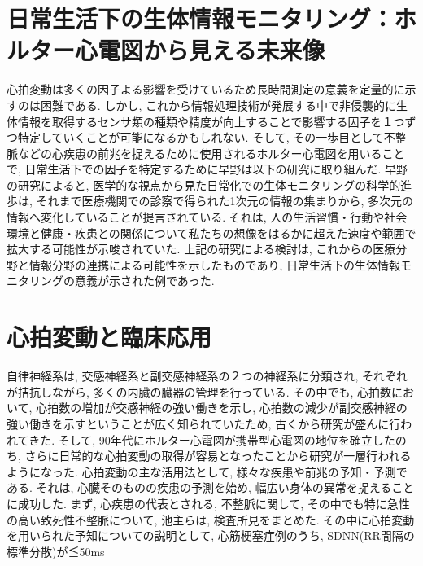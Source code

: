 \documentclass[report, 11pt, a4paper]{jsbook}
\begin{document}
\section{日常生活下の生体情報モニタリング：ホルター心電図から見える未来像}
心拍変動は多くの因子よる影響を受けているため長時間測定の意義を定量的に示すのは困難である. しかし, これから情報処理技術が発展する中で非侵襲的に生体情報を取得するセンサ類の種類や精度が向上することで影響する因子を１つずつ特定していくことが可能になるかもしれない. そして, その一歩目として不整脈などの心疾患の前兆を捉えるために使用されるホルター心電図を用いることで, 日常生活下での因子を特定するために早野は以下の研究に取り組んだ. 
早野の研究によると, 医学的な視点から見た日常化での生体モニタリングの科学的進歩は, それまで医療機関での診察で得られた1次元の情報の集まりから, 多次元の情報へ変化していることが提言されている. それは, 人の生活習慣・行動や社会環境と健康・疾患との関係について私たちの想像をはるかに超えた速度や範囲で拡大する可能性が示唆されていた. 上記の研究による検討は, これからの医療分野と情報分野の連携による可能性を示したものであり, 日常生活下の生体情報モニタリングの意義が示された例であった.

\section{心拍変動と臨床応用}
自律神経系は, 交感神経系と副交感神経系の２つの神経系に分類され, それぞれが拮抗しながら, 多くの内臓の臓器の管理を行っている. その中でも, 心拍数において, 心拍数の増加が交感神経の強い働きを示し, 心拍数の減少が副交感神経の強い働きを示すということが広く知られていたため, 古くから研究が盛んに行われてきた. そして, 90年代にホルター心電図が携帯型心電図の地位を確立したのち, さらに日常的な心拍変動の取得が容易となったことから研究が一層行われるようになった. 心拍変動の主な活用法として, 様々な疾患や前兆の予知・予測である. それは, 心臓そのものの疾患の予測を始め, 幅広い身体の異常を捉えることに成功した. まず,  心疾患の代表とされる, 不整脈に関して, その中でも特に急性の高い致死性不整脈について, 池主らは, 検査所見をまとめた. その中に心拍変動を用いられた予知についての説明として, 心筋梗塞症例のうち, SDNN(RR間隔の標準分散)が≦50ms
\end{document}
